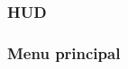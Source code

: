 \documentclass[french, 12pt]{article}
\begin{document}
        \subsubsection{HUD}
        \subsubsection{Menu principal}
        
        \newpage


    
    
    




\newpage
\listoffigures
\listoftables
\end{document}
